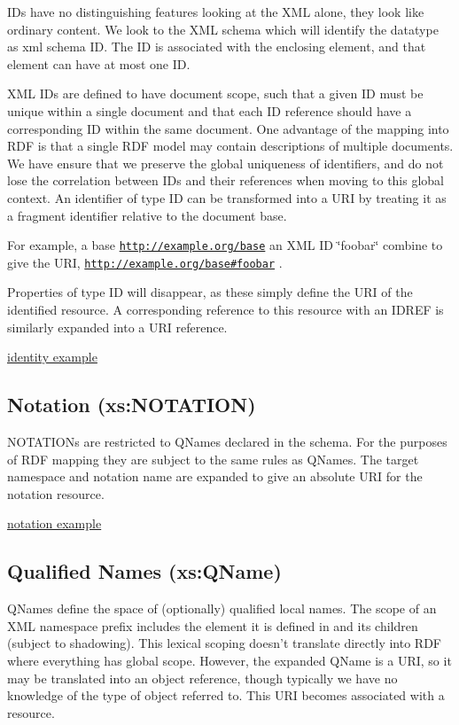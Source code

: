 IDs have no distinguishing features looking at the XML alone, they look like ordinary content. We look to the XML schema which will identify the datatype as xml schema ID. The ID is associated with the enclosing element, and that element can have at most one ID.

XML IDs are defined to have document scope, such that a given ID must be unique within a single document and that each ID reference should have a corresponding ID within the same document. One advantage of the mapping into RDF is that a single RDF model may contain descriptions of multiple documents. We have ensure that we preserve the global uniqueness of identifiers, and do not lose the correlation between IDs and their references when moving to this global context. An identifier of type ID can be transformed into a URI by treating it as a fragment identifier relative to the document base.

For example, a base {\ttfamily \href{http://example.org/base}{\tt http://example.org/base}} an XML ID \char`\"{}foobar\char`\"{} combine to give the URI, {\ttfamily \href{http://example.org/base#foobar}{\tt http://example.org/base\#foobar}} .

Properties of type ID will disappear, as these simply define the URI of the identified resource. A corresponding reference to this resource with an IDREF is similarly expanded into a URI reference.

\hyperlink{elementidentity}{identity example}\hypertarget{datatypes_notation}{}\subsection{Notation (xs:NOTATION)}\label{datatypes_notation}
NOTATIONs are restricted to QNames declared in the schema. For the purposes of RDF mapping they are subject to the same rules as QNames. The target namespace and notation name are expanded to give an absolute URI for the notation resource.

\hyperlink{attributenotation}{notation example}\hypertarget{datatypes_qNames}{}\subsection{Qualified Names (xs:QName)}\label{datatypes_qNames}
QNames define the space of (optionally) qualified local names. The scope of an XML namespace prefix includes the element it is defined in and its children (subject to shadowing). This lexical scoping doesn't translate directly into RDF where everything has global scope. However, the expanded QName is a URI, so it may be translated into an object reference, though typically we have no knowledge of the type of object referred to. This URI becomes associated with a resource.

